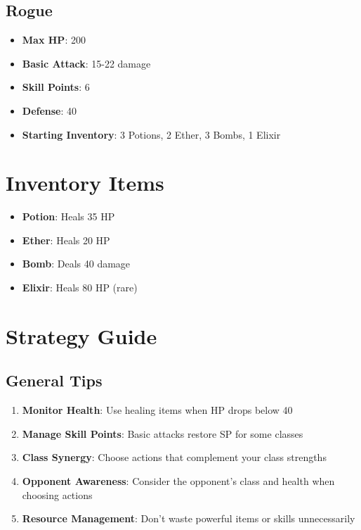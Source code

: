 \documentclass[12pt]{article}
\begin{document}
\subsection{Rogue}
\begin{itemize}
    \item \textbf{Max HP}: 200
    \item \textbf{Basic Attack}: 15-22 damage
    \item \textbf{Skill Points}: 6
    \item \textbf{Defense}: 40
    \item \textbf{Starting Inventory}: 3 Potions, 2 Ether, 3 Bombs, 1 Elixir
\end{itemize}

\section{Inventory Items}
\label{sec:inventory}

\begin{itemize}
    \item \textbf{Potion}: Heals 35 HP
    \item \textbf{Ether}: Heals 20 HP
    \item \textbf{Bomb}: Deals 40 damage
    \item \textbf{Elixir}: Heals 80 HP (rare)
\end{itemize}

\section{Strategy Guide}
\label{sec:strategy}

\subsection{General Tips}
\begin{enumerate}
    \item \textbf{Monitor Health}: Use healing items when HP drops below 40
    \item \textbf{Manage Skill Points}: Basic attacks restore SP for some classes
    \item \textbf{Class Synergy}: Choose actions that complement your class strengths
    \item \textbf{Opponent Awareness}: Consider the opponent's class and health when choosing actions
    \item \textbf{Resource Management}: Don't waste powerful items or skills unnecessarily
\end{enumerate}
\end{document}
